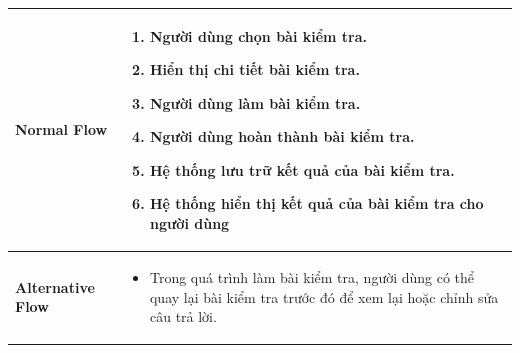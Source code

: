 \begin{longtable}[H]{|l|p{}|}
        \textbf{Normal Flow} &  \vspace{-0.75cm} 
            \begin{enumerate}[leftmargin=5.5mm]
                \setlength\itemsep{0em}
                \item Người dùng chọn bài kiểm tra.
                \item Hiển thị chi tiết bài kiểm tra.
                \item Người dùng làm bài kiểm tra.
                \item Người dùng hoàn thành bài kiểm tra.
                \item Hệ thống lưu trữ kết quả của bài kiểm tra.
                \item Hệ thống hiển thị kết quả của bài kiểm tra cho người dùng
            \end{enumerate}\\
            
        \hline
        
        \textbf{Alternative Flow} & \vspace{-0.75cm} \begin{itemize}[leftmargin=4mm]
            \setlength\itemsep{0em}
            \item Trong quá trình làm bài kiểm tra, người dùng có thể quay lại bài kiểm tra trước đó để xem lại hoặc chỉnh sửa câu trả lời.
        \end{itemize} \\
        
        \hline 
        

\end{longtable}
